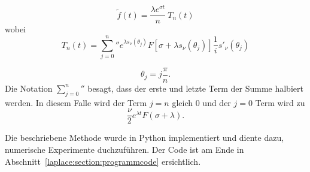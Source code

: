 \begin{equation}
\tilde{f}(t) = \frac{\lambda e^{\sigma t}}{n}~T_{n}(t)
\end{equation}
wobei 
\begin{equation}
T_{n}(t)
=
{\sum_{j=0}^n}'' e^{\lambda s_{\nu}(\theta_{j})}
F[\sigma + \lambda s_{\nu}(\theta_{j})]
\frac{1}{i} s'_{\nu}(\theta_{j})
\end{equation}

\begin{equation}
\theta_{j} = j \frac{\pi}{n}.
\end{equation}
Die Notation ${\sum_{j=0}^n}''$ besagt, dass der erste und letzte
Term der Summe halbiert werden.
In diesem Falle wird der Term $j=n$ gleich 0 und der $j=0$ Term wird zu
\begin{equation}
\frac{\nu}{2}e^{\lambda t}F(\sigma + \lambda).
\end{equation}


Die beschriebene Methode wurde in Python implementiert und diente
dazu, numerische Experimente duchzuführen.
Der Code ist am Ende in Abschnitt~\ref{laplace:section:programmcode}
ersichtlich.

